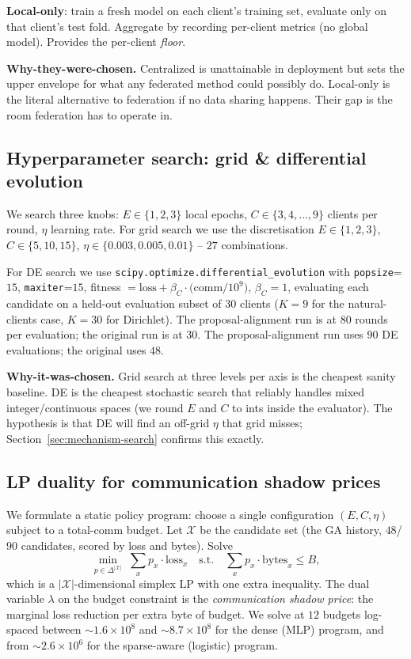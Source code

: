 \textbf{Local-only}: train a fresh model on each client's training set,
evaluate only on that client's test fold. Aggregate by recording per-client
metrics (no global model). Provides the per-client \emph{floor}.

\textbf{Why-they-were-chosen.} Centralized is unattainable in deployment but
sets the upper envelope for what any federated method could possibly do.
Local-only is the literal alternative to federation if no data sharing happens.
Their gap is the room federation has to operate in.

\subsection{Hyperparameter search: grid \& differential evolution}
We search three knobs: $E \!\in\! \{1,2,3\}$ local epochs, $C \!\in\!
\{3,4,\dots,9\}$ clients per round, $\eta$ learning rate. For grid search we
use the discretisation $E \!\in\! \{1,2,3\}$, $C \!\in\! \{5,10,15\}$,
$\eta \!\in\! \{0.003,0.005,0.01\}$ -- $27$ combinations.

For DE search we use \texttt{scipy.optimize.differential\_evolution} with
\texttt{popsize}=$15$, \texttt{maxiter}=$15$, fitness $= \text{loss} + \beta_C
\!\cdot\! \text{(comm/}10^9)$, $\beta_C = 1$, evaluating each candidate on a
held-out evaluation subset of $30$ clients ($K\!=\!9$ for the natural-clients
case, $K \!=\! 30$ for Dirichlet). The proposal-alignment run is at $80$ rounds
per evaluation; the original run is at $30$. The proposal-alignment run uses
$90$ DE evaluations; the original uses $48$.

\textbf{Why-it-was-chosen.} Grid search at three levels per axis is the cheapest
sanity baseline. DE is the cheapest stochastic search that reliably handles
mixed integer/continuous spaces (we round $E$ and $C$ to ints inside the
evaluator). The hypothesis is that DE will find an off-grid $\eta$ that grid
misses; Section~\ref{sec:mechanism-search} confirms this exactly.

\subsection{LP duality for communication shadow prices}
We formulate a static policy program: choose a single configuration $(E, C,
\eta)$ subject to a total-comm budget. Let $\mathcal{X}$ be the candidate set
(the GA history, $48$/$90$ candidates, scored by loss and bytes). Solve
\[
\min_{p \in \Delta^{|\mathcal{X}|}} \;\sum_x p_x \!\cdot\! \mathrm{loss}_x
\quad \text{s.t.} \quad \sum_x p_x \!\cdot\! \mathrm{bytes}_x \leq B,
\]
which is a $|\mathcal{X}|$-dimensional simplex LP with one extra inequality. The
dual variable $\lambda$ on the budget constraint is the
\emph{communication shadow price}: the marginal loss reduction per extra byte
of budget. We solve at $12$ budgets log-spaced between $\sim 1.6\!\times\!10^{8}$
and $\sim 8.7\!\times\!10^{8}$ for the dense (MLP) program, and from
$\sim 2.6\!\times\!10^{6}$ for the sparse-aware (logistic) program.

